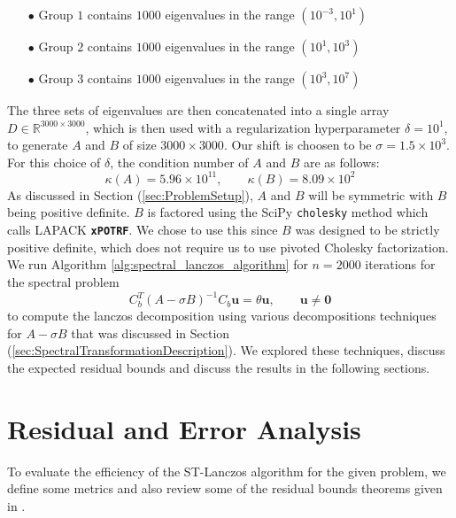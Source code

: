 \begin{itemize}
    \item[$\bullet$] Group $1$ contains $1000$ eigenvalues in the range $(10^{-3}, 10^{1})$
    \item[$\bullet$] Group $2$ contains $1000$ eigenvalues in the range $(10^1, 10^3)$
    \item[$\bullet$] Group $3$ contains $1000$ eigenvalues in the range $(10^3, 10^7)$
\end{itemize}

The three sets of eigenvalues are then concatenated into a single array $D \in \mathbb{R}^{3000 \times 3000}$, which is then used with a regularization hyperparameter $\delta = 10^{1}$, to generate $A$ and $B$ of size $3000 \times 3000$. Our shift is choosen to be $\sigma = 1.5 \times 10^3$. For this choice of $\delta$, the condition number of $A$ and $B$ are as follows:
\begin{equation*}
    \kappa(A) = 5.96 \times 10^{11}, \qquad \kappa(B) = 8.09 \times 10^2
\end{equation*}
As discussed in Section (\ref{sec:ProblemSetup}), $A$ and $B$ will be symmetric with $B$ being positive definite.  $B$ is factored using the SciPy \texttt{cholesky} method which calls LAPACK \textbf{\texttt{xPOTRF}}. We chose to use this since $B$ was designed to be strictly positive definite, which does not require us to use  pivoted Cholesky factorization.   We run Algorithm \ref{alg:spectral_lanczos_algorithm} for $n=2000$ iterations for the spectral problem
\begin{equation}\label{eq:ShiftedInvertedProblem2}
	C_b^T (A-\sigma B)^{-1} C_b \mathbf{u} = \theta \mathbf{u}, \qquad \mathbf{u} \neq \mathbf{0}
\end{equation}
to compute the lanczos decomposition using various decompositions techniques for $A - \sigma B$ that was discussed in Section (\ref{sec:SpectralTransformationDescription}). We explored these techniques, discuss the expected residual bounds and discuss the results in the following sections.

\section{Residual and Error Analysis}
To evaluate the efficiency of the ST-Lanczos algorithm for the given problem, we define some metrics and also review some of the residual bounds theorems given in \cite{stewart2024spectraltransformationdensesymmetric}.

